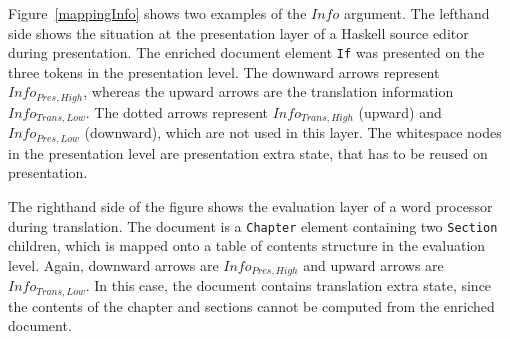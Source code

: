 Figure~\ref{mappingInfo} shows two examples of the $Info$ argument. The lefthand side shows the situation at the presentation layer of a Haskell source editor during presentation.  The enriched document element \verb|If|  was presented on the three tokens in the presentation level. The downward arrows represent $Info_{Pres,High}$, whereas the upward arrows are the translation information $Info_{Trans, Low}$. The dotted arrows represent $Info_{Trans,High}$ (upward) and $Info_{Pres,Low}$ (downward), which are not used in this layer. The whitespace nodes in the presentation level are presentation extra state, that has to be reused on presentation. 

The righthand side of the figure shows the evaluation layer of a word processor during translation. The document is a \verb|Chapter| element containing two \verb|Section| children, which is mapped onto a table of contents structure in the evaluation level. Again, downward arrows are $Info_{Pres,High}$ and upward arrows are $Info_{Trans,Low}$.  In this case, the document contains translation extra state, since the contents of the chapter and sections cannot be computed from the enriched document.  

